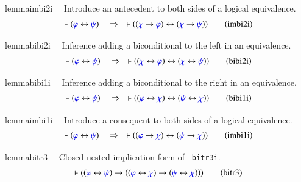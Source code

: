 \begin{restatable}{lemma}{imbi2i}~~ Introduce an antecedent to both sides of a
logical equivalence.  
\begin{align}
\vdash ( \mw{\varphi} \leftrightarrow \mw{\psi} )\quad\Rightarrow\quad \vdash (
    ( \mw{\chi} \rightarrow \mw{\varphi} ) \leftrightarrow ( \mw{\chi}
    \rightarrow \mw{\psi} ) )\label{eq:imbi2i}\tag{imbi2i}
\end{align}
\end{restatable}

\begin{restatable}{lemma}{bibi2i}~~ Inference adding a biconditional to the left
in an equivalence.
\begin{align}
\vdash ( \mw{\varphi} \leftrightarrow \mw{\psi} )\quad\Rightarrow\quad \vdash (
    ( \mw{\chi} \leftrightarrow \mw{\varphi} ) \leftrightarrow ( \mw{\chi}
    \leftrightarrow \mw{\psi} ) )\label{eq:bibi2i}\tag{bibi2i}
\end{align}
\end{restatable}

\begin{restatable}{lemma}{bibi1i}~~ Inference adding a biconditional to the
right in an equivalence.
\begin{align}
\vdash ( \mw{\varphi} \leftrightarrow \mw{\psi} )\quad\Rightarrow\quad \vdash (
    ( \mw{\varphi} \leftrightarrow \mw{\chi} ) \leftrightarrow ( \mw{\psi}
    \leftrightarrow \mw{\chi} ) )\label{eq:bibi1i}\tag{bibi1i}
\end{align}
\end{restatable}

\begin{restatable}{lemma}{imbi1i}~~ Introduce a consequent to both sides of a
logical equivalence.
\begin{align}
\vdash ( \mw{\varphi} \leftrightarrow \mw{\psi} )\quad\Rightarrow\quad \vdash (
    ( \mw{\varphi} \rightarrow \mw{\chi} ) \leftrightarrow ( \mw{\psi}
    \rightarrow \mw{\chi} ) )\label{eq:imbi1i}\tag{imbi1i}
\end{align}
\end{restatable}

\begin{restatable}{lemma}{bitr3}~~ Closed nested implication form of {\tt
bitr3i}.  
\begin{align}
\vdash ( ( \mw{\varphi} \leftrightarrow \mw{\psi} ) \rightarrow ( (
    \mw{\varphi} \leftrightarrow \mw{\chi} ) \rightarrow ( \mw{\psi}
    \leftrightarrow \mw{\chi} ) ) )\label{eq:bitr3}\tag{bitr3}
\end{align}
\end{restatable}

